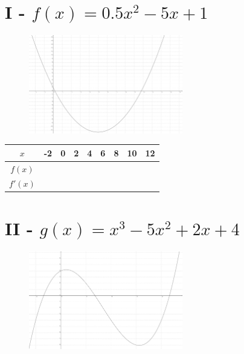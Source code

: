\documentclass[11pt]{article}
\begin{document}

\setlength{\columnseprule}{1pt}

\section{I - $f(x) = 0.5x^2 - 5x +1$}
\begin{figure}[H]
  \centering
  \includegraphics[width=0.6\textwidth]{sources/exo/grid.png}
\end{figure}

\begin{center}
  \begin{tabular}{| c | c | c | c | c | c | c | c | c | }
    \hline
    $x$    & -2               & 0                & 2                & 4                & 6                & 8                & 10               & 12\\
    \hline
    $f(x)$ & \phantom{123456} & \phantom{123456} & \phantom{123456} & \phantom{123456} & \phantom{123456} & \phantom{123456} & \phantom{123456} & \phantom{123456} \\
    \hline
    $f'(x)$ & \phantom{123456} & \phantom{123456} & \phantom{123456} & \phantom{123456} & \phantom{123456} & \phantom{123456} & \phantom{123456} & \phantom{123456} \\
    \hline
  \end{tabular}
\end{center}

\section{II - $g(x) = x^3 - 5x^2 + 2x + 4$}

\begin{figure}[H]
  \centering
  \includegraphics[width=0.6\textwidth]{sources/exo/grid2.png}
\end{figure}
\end{document}
